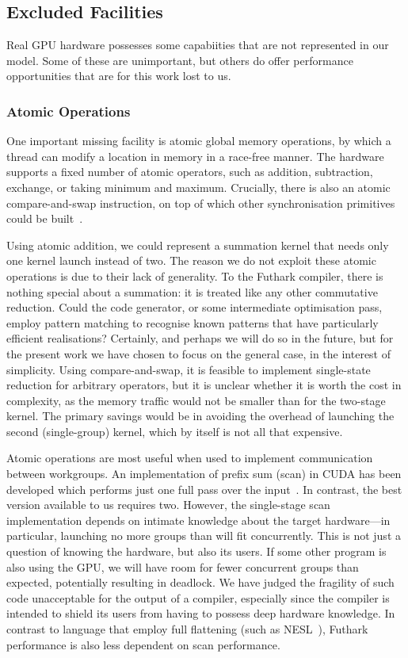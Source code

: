 \subsection{Excluded Facilities}

Real GPU hardware possesses some capabiities that are not represented
in our model.  Some of these are unimportant, but others do offer
performance opportunities that are for this work lost to us.

\subsubsection{Atomic Operations}

One important missing facility is atomic global memory operations, by
which a thread can modify a location in memory in a race-free manner.
The hardware supports a fixed number of atomic operators, such as
addition, subtraction, exchange, or taking minimum and maximum.
Crucially, there is also an atomic compare-and-swap instruction, on
top of which other synchronisation primitives could be
built~\cite{fraser2004practical}.

Using atomic addition, we could represent a summation kernel that
needs only one kernel launch instead of two.  The reason we do not
exploit these atomic operations is due to their lack of generality.
To the Futhark compiler, there is nothing special about a summation:
it is treated like any other commutative reduction.  Could the code
generator, or some intermediate optimisation pass, employ pattern
matching to recognise known patterns that have particularly efficient
realisations?  Certainly, and perhaps we will do so in the future, but
for the present work we have chosen to focus on the general case, in
the interest of simplicity.  Using compare-and-swap, it is feasible to
implement single-state reduction for arbitrary operators, but it is
unclear whether it is worth the cost in complexity, as the memory
traffic would not be smaller than for the two-stage
kernel.  The primary
savings would be in avoiding the overhead of launching the second
(single-group) kernel, which by itself is not all that expensive.

Atomic operations are most useful when used to implement communication
between workgroups.  An implementation of prefix sum (scan) in CUDA
has been developed which performs just one full pass over the
input~\cite{Maleki:2016:HTM:2908080.2908089}.  In contrast, the best
version available to us requires two.  However, the single-stage scan
implementation depends on intimate knowledge about the target
hardware---in particular, launching no more groups than will fit
concurrently.  This is not just a question of knowing the hardware,
but also its users.  If some other program is also using the GPU, we
will have room for fewer concurrent groups than expected, potentially
resulting in deadlock.  We have judged the fragility of such code
unacceptable for the output of a compiler, especially since the
compiler is intended to shield its users from having to possess deep
hardware knowledge.  In contrast to language that employ full
flattening (such as NESL~\cite{BlellochCACM96NESL}), Futhark
performance is also less dependent on scan performance.


